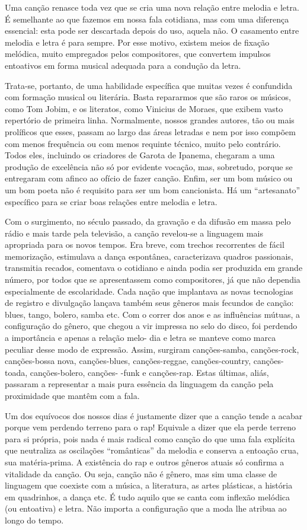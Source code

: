 Uma canção renasce toda vez que se cria uma nova relação entre melodia e
letra. É semelhante ao que fazemos em nossa fala cotidiana, mas com uma
diferença essencial: esta pode ser descartada depois do uso, aquela não.
O casamento entre melodia e letra é para sempre. Por esse motivo,
existem meios de fixação melódica, muito empregados pelos compositores,
que convertem impulsos entoativos em forma musical adequada para a
condução da letra.

Trata-se, portanto, de uma habilidade específica que muitas vezes é
confundida com formação musical ou literária. Basta repararmos que são
raros os músicos, como Tom Jobim, e os literatos, como Vinicius de
Moraes, que exibem vasto repertório de primeira linha. Normalmente,
nossos grandes autores, tão ou mais prolíficos que esses, passam ao
largo das áreas letradas e nem por isso compõem com menos frequência ou
com menos requinte técnico, muito pelo contrário. Todos eles, incluindo
os criadores de Garota de Ipanema, chegaram a uma produção de excelência
não só por evidente vocação, mas, sobretudo, porque se entregaram com
afinco ao ofício de fazer canção. Enfim, ser um bom músico ou um bom
poeta não é requisito para ser um bom cancionista. Há um ``artesanato''
específico para se criar boas relações entre melodia e letra.

Com o surgimento, no século passado, da gravação e da difusão em massa
pelo rádio e mais tarde pela televisão, a canção revelou-se a linguagem
mais apropriada para os novos tempos. Era breve, com trechos recorrentes
de fácil memorização, estimulava a dança espontânea, caracterizava
quadros passionais, transmitia recados, comentava o cotidiano e ainda
podia ser produzida em grande número, por todos que se apresentassem
como compositores, já que não dependia especialmente de escolaridade.
Cada nação que implantava as novas tecnologias de registro e divulgação
lançava também seus gêneros mais fecundos de canção: blues, tango,
bolero, samba etc. Com o correr dos anos e as influências mútuas, a
configuração do gênero, que chegou a vir impressa no selo do disco, foi
perdendo a importância e apenas a relação melo- dia e letra se manteve
como marca peculiar desse modo de expressão. Assim, surgiram
canções-samba, canções-rock, canções-bossa nova, canções-blues,
canções-reggae, canções-country, canções-toada, canções-bolero, canções-
-funk e canções-rap. Estas últimas, aliás, passaram a representar a mais
pura essência da linguagem da canção pela proximidade que mantêm com a
fala.~

Um dos equívocos dos nossos dias é justamente dizer que a canção tende a
acabar porque vem perdendo terreno para o rap! Equivale a dizer que ela
perde terreno para si própria, pois nada é mais radical como canção do
que uma fala explícita que neutraliza as oscilações ``românticas'' da
melodia e conserva a entoação crua, sua matéria-prima. A existência do
rap e outros gêneros atuais só confirma a vitalidade da canção. Ou seja,
canção não é gênero, mas sim uma classe de linguagem que coexiste com a
música, a literatura, as artes plásticas, a história em quadrinhos, a
dança etc. É tudo aquilo que se canta com inflexão melódica (ou
entoativa) e letra. Não importa a configuração que a moda lhe atribua ao
longo do tempo.

